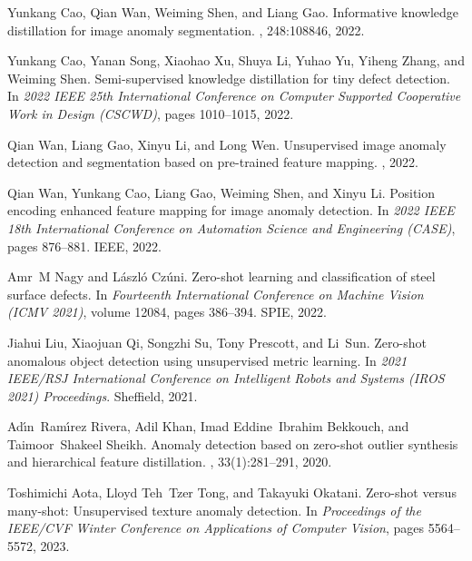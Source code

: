 \documentclass{article}
\begin{document}
{\begin{thebibliography}{10}
Yunkang Cao, Qian Wan, Weiming Shen, and Liang Gao.
\newblock Informative knowledge distillation for image anomaly segmentation.
, 248:108846, 2022.

Yunkang Cao, Yanan Song, Xiaohao Xu, Shuya Li, Yuhao Yu, Yiheng Zhang, and
  Weiming Shen.
\newblock Semi-supervised knowledge distillation for tiny defect detection.
\newblock In {\em 2022 IEEE 25th International Conference on Computer Supported
  Cooperative Work in Design (CSCWD)}, pages 1010--1015, 2022.

Qian Wan, Liang Gao, Xinyu Li, and Long Wen.
\newblock Unsupervised image anomaly detection and segmentation based on
  pre-trained feature mapping.
, 2022.

Qian Wan, Yunkang Cao, Liang Gao, Weiming Shen, and Xinyu Li.
\newblock Position encoding enhanced feature mapping for image anomaly
  detection.
\newblock In {\em 2022 {IEEE} 18th International Conference on Automation
  Science and Engineering ({CASE})}, pages 876--881. {IEEE}, 2022.

Amr~M Nagy and L{\'a}szl{\'o} Cz{\'u}ni.
\newblock Zero-shot learning and classification of steel surface defects.
\newblock In {\em Fourteenth International Conference on Machine Vision (ICMV
  2021)}, volume 12084, pages 386--394. SPIE, 2022.

Jiahui Liu, Xiaojuan Qi, Songzhi Su, Tony Prescott, and Li~Sun.
\newblock Zero-shot anomalous object detection using unsupervised metric
  learning.
\newblock In {\em 2021 IEEE/RSJ International Conference on Intelligent Robots
  and Systems (IROS 2021) Proceedings}. Sheffield, 2021.

Ad{\'\i}n~Ram{\'\i}rez Rivera, Adil Khan, Imad Eddine~Ibrahim Bekkouch, and
  Taimoor~Shakeel Sheikh.
\newblock Anomaly detection based on zero-shot outlier synthesis and
  hierarchical feature distillation.
,
  33(1):281--291, 2020.

Toshimichi Aota, Lloyd Teh~Tzer Tong, and Takayuki Okatani.
\newblock Zero-shot versus many-shot: Unsupervised texture anomaly detection.
\newblock In {\em Proceedings of the IEEE/CVF Winter Conference on Applications
  of Computer Vision}, pages 5564--5572, 2023.


\end{thebibliography}}
\end{document}
